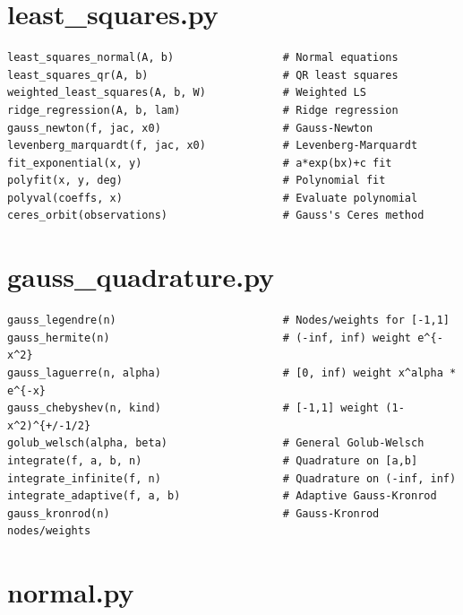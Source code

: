 \section{least\_squares.py}

\begin{lstlisting}[style=python]
least_squares_normal(A, b)                 # Normal equations
least_squares_qr(A, b)                     # QR least squares
weighted_least_squares(A, b, W)            # Weighted LS
ridge_regression(A, b, lam)                # Ridge regression
gauss_newton(f, jac, x0)                   # Gauss-Newton
levenberg_marquardt(f, jac, x0)            # Levenberg-Marquardt
fit_exponential(x, y)                      # a*exp(bx)+c fit
polyfit(x, y, deg)                         # Polynomial fit
polyval(coeffs, x)                         # Evaluate polynomial
ceres_orbit(observations)                  # Gauss's Ceres method
\end{lstlisting}

\section{gauss\_quadrature.py}

\begin{lstlisting}[style=python]
gauss_legendre(n)                          # Nodes/weights for [-1,1]
gauss_hermite(n)                           # (-inf, inf) weight e^{-x^2}
gauss_laguerre(n, alpha)                   # [0, inf) weight x^alpha * e^{-x}
gauss_chebyshev(n, kind)                   # [-1,1] weight (1-x^2)^{+/-1/2}
golub_welsch(alpha, beta)                  # General Golub-Welsch
integrate(f, a, b, n)                      # Quadrature on [a,b]
integrate_infinite(f, n)                   # Quadrature on (-inf, inf)
integrate_adaptive(f, a, b)                # Adaptive Gauss-Kronrod
gauss_kronrod(n)                           # Gauss-Kronrod nodes/weights
\end{lstlisting}

\section{normal.py}

